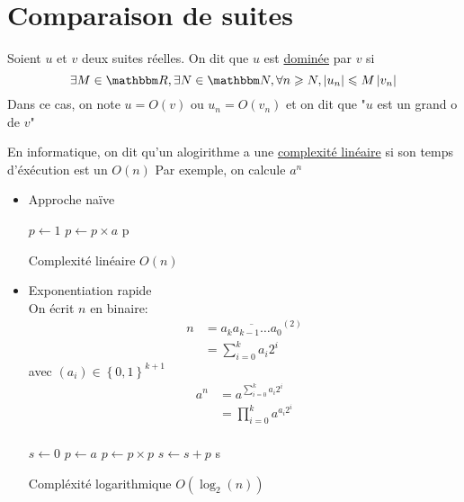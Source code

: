 \part{Comparaison de suites}

\begin{defn}
	Soient $u$ et $v$ deux suites réelles. On dit que $u$ est \underline{dominée} par  $v$ si \[
	\exists M\in \R, \exists N\in \N,\forall n\ge N,\left| u_n \right| \le M \left| v_n \right| 
	\] Dans ce cas, on note $u = O(v)$ ou $u_n = O(v_n)$ et on dit que "$u$ est un grand o de $v$"
\end{defn}

\begin{exm}
	En informatique, on dit qu'un alogirithme a une \underline{complexité linéaire} si son temps d'éxécution est un $O(n)$ 
	Par exemple, on calcule $a^n$ 

	\begin{itemize}
		\item Approche naïve
			\begin{algorithm}
				\begin{algorithmic}[1]
					\State $p \gets 1$
						\State $p \gets p \times a$
					\EndFor
					\State \Return p
				\end{algorithmic}
			\end{algorithm}
			Complexité linéaire $O(n)$
		\item Exponentiation rapide\\
			On écrit $n$ en binaire: \begin{align*}
				n &= \overline{a_k a_{k-1}\ldots a_0}^{(2)}\\
					&= \sum_{i=0}^{k} a_i 2^i
			\end{align*} avec $(a_i) \in \left\{ 0,1 \right\} ^{k+1}$
			\begin{align*}
				a^n &= a^{\sum_{i=0}^{k} a_i 2^i} \\
				&= \prod_{i=0}^{k} a^{a_i 2^i}  \\
			\end{align*}
			
			\begin{algorithm}
				\begin{algorithmic}
					[1]

					\State $s \gets 0$
					\State $p \gets a$
					\For{ $i \in \left\llbracket 0, \log_2(n) \right\rrbracket$}
						\State $p \gets p \times p$
						\If{$a[i] = 1$}
							\State $s \gets s + p$
						\EndIf
					\EndFor
					\State \Return s
				\end{algorithmic}
			\end{algorithm}
			Compléxité logarithmique $O(\log_2(n))$
	\end{itemize}
\end{exm}


